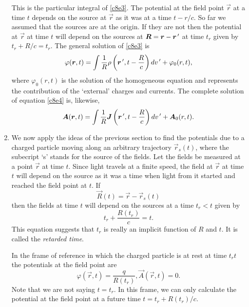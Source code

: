 \begin{enumerate}
\begin{equation}
\end{equation}
This is the particular integral of \eqref{c8e3}. The potential at the field 
point $\vec{r}$ at a time $t$ depends on the source at $\vec{r}$ as it was at 
a time $t - r/c$. So far we assumed that the sources are at the origin. If they
are not then the potential at $\vec{r}$ at time $t$ will depend on the sources
at $\bm{R} = \bm{r} - \bm{r}^{\,\prime}$ at time $t_r$ given by $t_r + R/c = t_r$. 
The general solution of \eqref{c8e3} is
\begin{equation}\label{c8e13}
\varphi(\bm{r}, t) = 
\int\frac{1}{R}\rho\left(\bm{r}^{\,\prime}, t - \frac{R}{c}\right)dv^{\,\prime}
 + \varphi_0(r, t),
\end{equation}
where $\varphi_0(r, t)$ is the solution of the homogeneous equation and 
represents the contribution of the `external' charges and currents. The 
complete solution of equation \eqref{c8e4} is, likewise,
\begin{equation}\label{c8e14}
\bm{A}(\bm{r}, t) = 
\int\frac{1}{R}\bm{J}\left(\bm{r}^{\,\prime}, t - \frac{R}{c}\right)dv^{\,\prime}
 + \bm{A}_0(r, t).
\end{equation}

\item We now apply the ideas of the previous section to find the potentials
due to a charged particle moving along an arbitrary trajectory $\vec{r}_s(t)$,
where the subecript `s' stands for the source of the fields. Let the fields be
measured at a point $\vec{r}$ at time $t$. Since light travels at a finite 
speed, the field at $\vec{r}$ at time $t$ will depend on the source as it was
a time when light from it started and reached the field point at $t$. If 
\begin{equation}\label{c8e15}
\vec{R}(t) = \vec{r} - \vec{r}_s(t)
\end{equation}
then the fields at time $t$ will depend on the sources at a time $t_r < t$ 
given by
\begin{equation}\label{c8e16}
t_r + \frac{R(t_r)}{c} = t.
\end{equation}
This equation suggests that $t_r$ is really an implicit function of $R$ and $t$.
It is called the \emph{retarded time}.

In the frame of reference in which the charged particle is at rest at time
$t_rt$ the potentials at the field point are
\begin{equation}\label{c8e17}
\varphi(\vec{r}, t) = \frac{q}{R(t_r)}, \vec{A}(\vec{r}, t) = 0.
\end{equation}
Note that we are not saying $t = t_r$. In this frame, we can only calculate the
potential at the field point at a future time $t = t_r + R(t_r)/c$.


\end{enumerate}
